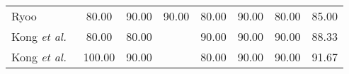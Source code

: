 \documentclass[9pt,journal,letterpaper,twocolumn]{IEEEtran}
\begin{document}
\begin{table}[!t]
{\begin{center}
\begin{tabular}{lc cc cccc}
					\hspace{-0.5em}Ryoo ~\cite{ryoo2011human} & \hspace{-0.5em}80.00\hspace{-0.5em} & \hspace{-0.5em}90.00\hspace{-0.5em} & \hspace{-0.5em}90.00\hspace{-0.5em} & \hspace{-0.5em}80.00\hspace{-0.5em} & \hspace{-0.5em}90.00\hspace{-0.5em} & \hspace{-0.5em}80.00\hspace{-0.5em} & \hspace{-0.5em}85.00\hspace{-0.5em} \\
					\hspace{-0.5em}Kong {\em et al.}~\cite{kong2012leraning} & \hspace{-0.5em}80.00\hspace{-0.5em} & \hspace{-0.5em}80.00\hspace{-0.5em} & \hspace{-0.5em}{100.00}\hspace{-0.5em} & \hspace{-0.5em}90.00\hspace{-0.5em} & \hspace{-0.5em}90.00\hspace{-0.5em} & \hspace{-0.5em}90.00\hspace{-0.5em} & \hspace{-0.5em}88.33\hspace{-0.5em} \\
					\hspace{-0.5em}Kong {\em et al.}~\cite{kong2014interactive}  & \hspace{-0.5em}100.00\hspace{-0.5em} & \hspace{-0.5em}90.00\hspace{-0.5em} & \hspace{-0.5em}{100.00}\hspace{-0.5em} & \hspace{-0.5em}80.00\hspace{-0.5em} & \hspace{-0.5em}90.00\hspace{-0.5em} & \hspace{-0.5em}90.00\hspace{-0.5em} & \hspace{-0.5em}91.67\hspace{-0.5em}  \\

\end{tabular}
\end{center}}
\end{table}
\end{document}
